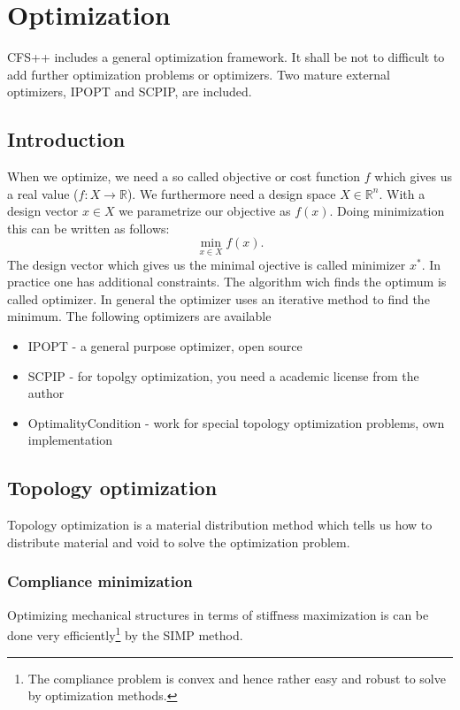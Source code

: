 \chapter{Optimization}
CFS++ includes a general optimization framework. It shall be not to difficult to
add further optimization problems or optimizers. Two mature external optimizers, IPOPT and SCPIP, are included. 

\section{Introduction}
When we optimize, we need a so called objective or cost function $f$ which 
gives us a real value ($f: X \to \mathbb{R}$). We furthermore need a 
design space $X \in \mathbb{R}^n$. With a design vector $x \in X$ we parametrize
our objective as $f(x)$. Doing minimization this can be written as follows:
\begin{equation}
\min_{x \in X} f(x).
\label{eqn:unconstrained_minimum}
\end{equation}
The design vector which gives us the minimal ojective is called minimizer $x^*$.
In practice one has additional constraints. The algorithm wich finds the 
optimum is called optimizer. In general the optimizer uses an iterative method
to find the minimum. The following optimizers are available
\begin{itemize}
\item IPOPT - a general purpose optimizer, open source
\item SCPIP - for topolgy optimization, you need a academic license from the author
\item OptimalityCondition - work for special topology optimization problems, own implementation
\end{itemize}


\section{Topology optimization}
\label{sec:topology_optimization}
Topology optimization is a material distribution method which tells us how to
distribute material and void to solve the optimization problem. 
\subsection{Compliance minimization}
Optimizing mechanical structures in terms of stiffness maximization is 
can be done very efficiently\footnote{The compliance problem is convex and hence
rather easy and robust to solve by optimization methods.} by the SIMP method. 
